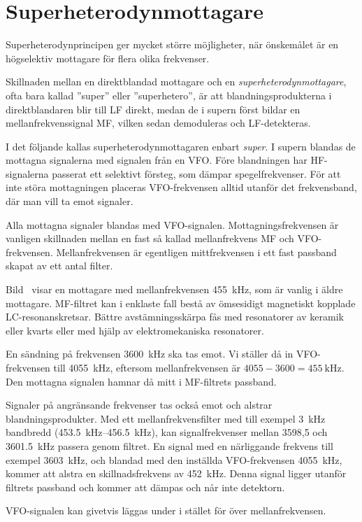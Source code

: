 \section{Superheterodynmottagare}
\label{superheterodynmottagaren}

Superheterodynprincipen ger mycket större möjligheter, när önskemålet
är en högselektiv mottagare för flera olika frekvenser.

Skillnaden mellan en direktblandad mottagare och en
\emph{superheterodynmottagare}, ofta bara kallad ''super'' eller
''superhetero'', är att blandningsprodukterna i direktblandaren blir till
LF direkt, medan de i supern först bildar en mellanfrekvenssignal MF,
vilken sedan demoduleras och LF-detekteras.

I det följande kallas superheterodynmottagaren enbart \emph{super}.
I supern blandas de mottagna signalerna med signalen från en VFO.
Före blandningen har HF-signalerna passerat ett selektivt försteg, som
dämpar spegelfrekvenser.
För att inte störa mottagningen placeras VFO-frekvensen alltid utanför
det frekvensband, där man vill ta emot signaler.

Alla mottagna signaler blandas med VFO-signalen.
Mottagningsfrekvensen är vanligen skillnaden mellan en fast så kallad
mellanfrekvens MF och VFO-frekvensen.
Mellanfrekvensen är egentligen mittfrekvensen i ett fast passband skapat av
ett antal filter.


Bild~ visar en mottagare med mellanfrekvensen
\qty{455}{\kilo\hertz}, som är vanlig i äldre mottagare.
MF-filtret kan i enklaste fall bestå av ömsesidigt magnetiskt kopplade
LC-resonanskretsar.
Bättre avstämningsskärpa fås med resonatorer av keramik eller kvarts eller med
hjälp av elektromekaniska resonatorer.

\begin{tcolorbox}[title=Exempel]
En sändning på frekvensen \qty{3600}{\kilo\hertz} ska tas emot.
Vi ställer då in VFO-frekvensen till \qty{4055}{\kilo\hertz}, eftersom
mellanfrekvensen är \(4055 - 3600 = \qty{455}{\kilo\hertz}\).
Den mottagna signalen hamnar då mitt i MF-filtrets passband.

Signaler på angränsande frekvenser tas också emot och alstrar
blandningsprodukter.
Med ett mellanfrekvensfilter med till exempel \qty{3}{\kilo\hertz} bandbredd
(\SIrange{453,5}{456,5}{\kilo\hertz}), kan signalfrekvenser mellan 3598,5 och
\qty{3601,5}{\kilo\hertz} passera genom filtret.
En signal med en närliggande frekvens till exempel \qty{3603}{\kilo\hertz}, och
blandad med den inställda VFO-frekvensen \qty{4055}{\kilo\hertz}, kommer att
alstra en skillnadsfrekvens av \qty{452}{\kilo\hertz}.
Denna signal ligger utanför filtrets passband och kommer att dämpas och når
inte detektorn.

VFO-signalen kan givetvis läggas under i stället för över mellanfrekvensen.
\end{tcolorbox}

